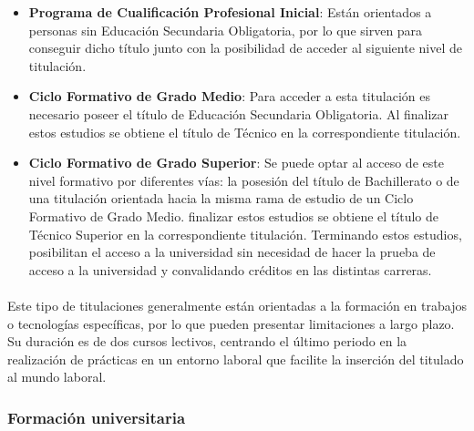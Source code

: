 \documentclass[12pt, a4paper]{report}
\begin{document}
                \begin{itemize}
					
                    \item \textbf{Programa de Cualificación Profesional Inicial}: 
                    Están orientados a personas sin Educación Secundaria Obligatoria, por lo que sirven para conseguir dicho título junto con la posibilidad de acceder al siguiente nivel de titulación.
                    
                    \item \textbf{Ciclo Formativo de Grado Medio}: 
                    Para acceder a esta titulación es necesario poseer el título de Educación Secundaria Obligatoria. Al finalizar estos estudios se obtiene el título de Técnico en la correspondiente titulación.\cite{wikipedia:fp-spain}
                    
                    \item \textbf{Ciclo Formativo de Grado Superior}:
                   	Se puede optar al acceso de este nivel formativo por diferentes vías: la posesión del título de Bachillerato o de una titulación orientada hacia la misma rama de estudio de un Ciclo Formativo de Grado Medio. finalizar estos estudios se obtiene el título de Técnico Superior en la correspondiente titulación. Terminando estos estudios, posibilitan el acceso a la universidad sin necesidad de hacer la prueba de acceso a la universidad y convalidando créditos en las distintas carreras.\cite{wikipedia:fp-spain}
				
                \end{itemize}

        		\paragraph{}
				Este tipo de titulaciones generalmente están orientadas a la formación en trabajos o tecnologías específicas, por lo que pueden presentar limitaciones a largo plazo. Su duración es de dos cursos lectivos, centrando el último periodo en la realización de prácticas en un entorno laboral que facilite la inserción del titulado al mundo laboral.

        	
    		\subsubsection{Formación universitaria}
\end{document}
